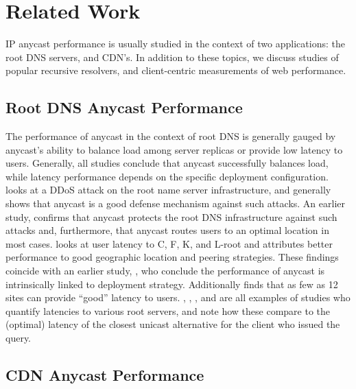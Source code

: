 \documentclass[sigconf,nonacm,10pt]{acmart}
\begin{document}
\section{Related Work}\label{related-work-1}

IP anycast performance is usually studied in the context of two
applications: the root DNS servers, and CDN's. In addition to these
topics, we discuss studies of popular recursive resolvers, and
client-centric measurements of web performance.

\subsection{Root DNS Anycast
Performance}\label{root-dns-anycast-performance}

The performance of anycast in the context of root DNS is generally
gauged by anycast's ability to balance load among server replicas or
provide low latency to users. Generally, all studies conclude that
anycast successfully balances load, while latency performance depends on
the specific deployment configuration. \cite{moura2016anycast} looks at
a DDoS attack on the root name server infrastructure, and generally
shows that anycast is a good defense mechanism against such attacks. An
earlier study, \cite{sarat2006use} confirms that anycast protects the
root DNS infrastructure against such attacks and, furthermore, that
anycast routes users to an optimal location in most cases.
\cite{de2017anycast} looks at user latency to C, F, K, and L-root and
attributes better performance to good geographic location and peering
strategies. These findings coincide with an earlier study,
\cite{ballani2006measurement}, who conclude the performance of anycast
is intrinsically linked to deployment strategy. Additionally
\cite{de2017anycast} finds that as few as 12 sites can provide ``good''
latency to users. \cite{li_levin_spring_bhattacharjee_2018},
\cite{colitti2006evaluating}, \cite{de2017anycast}, and
\cite{liang2013measuring} are all examples of studies who quantify
latencies to various root servers, and note how these compare to the
(optimal) latency of the closest unicast alternative for the client who
issued the query.

\subsection{CDN Anycast Performance}\label{cdn-anycast-performance}
\end{document}
